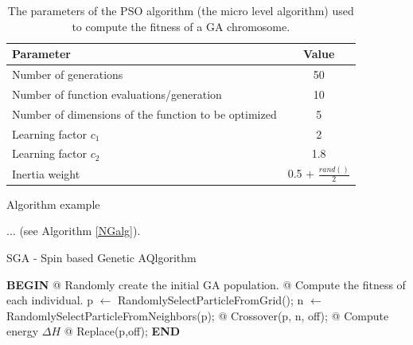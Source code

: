 \documentclass[runningheads,a4paper,11pt]{report}
\begin{document}
\begin{table}[htbp]
	\caption{The parameters of the PSO algorithm (the micro level algorithm) used to compute the fitness of a GA chromosome.}
	\label{tab3PSO}
		\begin{center}
			\begin{tabular}{p{220pt}c}

				\textbf{Parameter}& \textbf{Value} \\
				\hline\hline
 				Number of generations& 50 \\
 				Number of function evaluations/generation& 10 \\
 				Number of dimensions of the function to be optimized& 5 \\
 				Learning factor $c_{1}$& 2 \\
 				Learning factor $c_{2}$ & 1.8\\
 				Inertia weight& 0.5 + $\frac{rand()}{2}$\\
		
			\end{tabular}
		\end{center}
\end{table}

Algorithm example 

$\ldots$ (see Algorithm \ref{NGalg}).



\begin{algorithm}
	\caption{SGA - Spin based Genetic AQlgorithm}
	\label{NGalg}
		\begin{algorithmic}


			\STATE \textbf{BEGIN}
  		\STATE @ Randomly create the initial GA population.
  		\STATE @ Compute the fitness of each individual.
  				\STATE p $\leftarrow$ RandomlySelectParticleFromGrid();
  				\STATE n $\leftarrow$ RandomlySelectParticleFromNeighbors(p);
  				\STATE @ Crossover(p, n, off);
  				\STATE @ Compute energy $\Delta H$
  					\STATE @ Replace(p,off);
  				\ENDIF
  			\ENDFOR
  		\ENDFOR
  		\STATE \textbf{END}
\end{algorithmic}
\end{algorithm}




\end{document}
